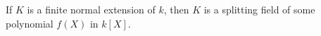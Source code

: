 If $K$ is a finite normal extension of $k$, then $K$ is a splitting field of some polynomial $f(X)$ in $k[X]$.
